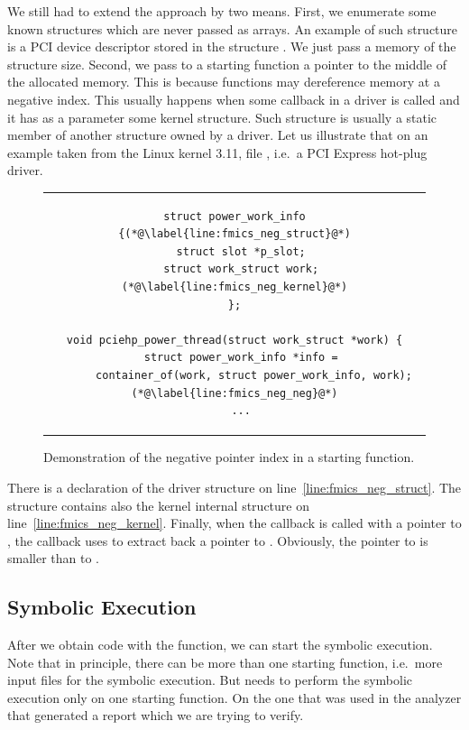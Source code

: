 We still had to extend the approach by two means. First, we enumerate some
known structures which are never passed as arrays. An example of such
structure is a PCI device descriptor stored in the structure .
We just pass a memory of the structure size.  Second, we pass to a starting
function a pointer to the middle of the allocated memory. This is because
functions may dereference memory at a negative index. This usually happens
when some callback in a driver is called and it has as a parameter some kernel
structure. Such structure is usually a static member of another structure
owned by a driver. Let us illustrate that on an example taken from the Linux
kernel 3.11, file , i.e.\ a PCI
Express hot-plug driver.
\begin{figure}[htb]
    \begin{center}
    \begin{tabular}{c}
    \begin{lstlisting}
struct power_work_info {(*@\label{line:fmics_neg_struct}@*)
  struct slot *p_slot;
  struct work_struct work;(*@\label{line:fmics_neg_kernel}@*)
};

void pciehp_power_thread(struct work_struct *work) {
  struct power_work_info *info =
	  container_of(work, struct power_work_info, work);(*@\label{line:fmics_neg_neg}@*)
  ...
    \end{lstlisting}
    \end{tabular}
    \end{center}
    \caption{Demonstration of the negative pointer index in a starting
    function.}
    \label{fig:fmics_neg}
\end{figure}
There is a declaration of the driver structure  on
line~\ref{line:fmics_neg_struct}. The structure contains also the kernel
internal structure  on line~\ref{line:fmics_neg_kernel}.
Finally, when the callback  is called with a pointer
to , the callback uses  to extract back a
pointer to . Obviously, the pointer to
 is smaller than to .

\subsection{Symbolic Execution}
After we obtain \llvm code with the  function, we can start the
symbolic execution. Note that in principle, there can be more than one
starting function, i.e.\ more input files for the symbolic execution. But
\klee needs to perform the symbolic execution only on one starting function.
On the one that was used in the analyzer that generated a report which we are
trying to verify.

